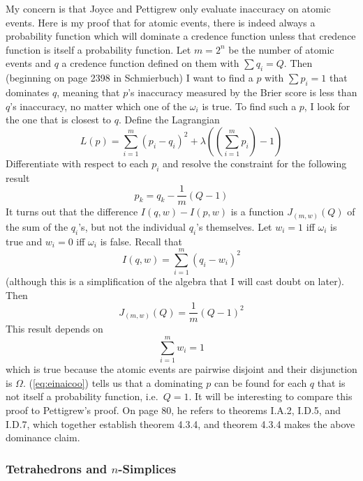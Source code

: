 \documentclass[12pt]{article}
\begin{document}
My concern is that Joyce and Pettigrew only evaluate inaccuracy on
atomic events. Here is my proof that for atomic events, there is
indeed always a probability function which will dominate a credence
function unless that credence function is itself a probability
function. Let $m=2^{n}$ be the number of atomic events and $q$ a
credence function defined on them with $\sum{}q_{i}=Q$. Then
(beginning on page 2398 in Schmierbuch) I want to find a $p$ with
$\sum{}p_{i}=1$ that dominates $q$, meaning that $p$'s inaccuracy
measured by the Brier score is less than $q$'s inaccuracy, no matter
which one of the $\omega_{i}$ is true. To find such a $p$, I look for
the one that is closest to $q$. Define the Lagrangian
\begin{equation}
  \label{eq:ohyaihoh}
  L(p)=\sum_{i=1}^{m}(p_{i}-q_{i})^{2}+\lambda\left(\left(\sum_{i=1}^{m}p_{i}\right)-1\right)
\end{equation}
Differentiate with respect to each $p_{i}$ and resolve the constraint
for the following result
\begin{equation}
  \label{eq:aezedoop}
  p_{k}=q_{k}-\frac{1}{m}(Q-1)
\end{equation}
It turns out that the difference $I(q,w)-I(p,w)$ is a function
$J_{(m,w)}(Q)$ of the sum of the $q_{i}$'s, but not the individual
$q_{i}$'s themselves. Let $w_{i}=1$ iff $\omega_{i}$ is true
and $w_{i}=0$ iff $\omega_{i}$ is false. Recall that
\begin{equation}
  \label{eq:baviedam}
  I(q,w)=\sum_{i=1}^{m}\left(q_{i}-w_{i}\right)^{2}
\end{equation}
(although this is a simplification of the algebra that I will cast
doubt on later). Then
\begin{equation}
  \label{eq:einaicoo}
J_{(m,w)}(Q)=\frac{1}{m}(Q-1)^{2}
\end{equation}
This result depends on
\begin{equation}
  \label{eq:tiduahom}
\sum_{i=1}^{m}w_{i}=1  
\end{equation}
which is true because the atomic events are pairwise disjoint and
their disjunction is $\Omega$. (\ref{eq:einaicoo}) tells us that a
dominating $p$ can be found for each $q$ that is not itself a
probability function, i.e.\ $Q=1$. It will be interesting to compare
this proof to Pettigrew's proof. On page 80, he refers to theorems
I.A.2, I.D.5, and I.D.7, which together establish theorem 4.3.4, and
theorem 4.3.4 makes the above dominance claim.

\subsubsection{Tetrahedrons and $n$-Simplices}
\label{subsubsection:ofiedeeb}
\end{document}
